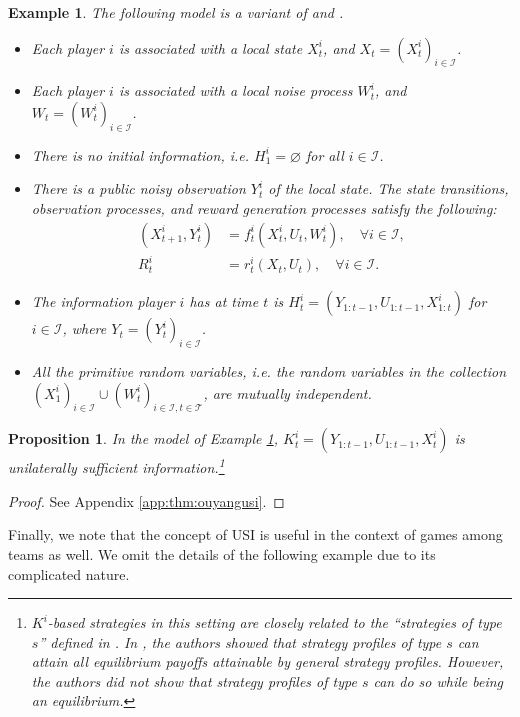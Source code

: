 \documentclass[pdflatex,sn-basic]{sn-jnl}
\newcommand{\Comp}{K}
\theoremstyle{thmstyleone}%
\newtheorem{prop}{Proposition}
\theoremstyle{thmstyletwo}%
\theoremstyle{thmstylethree}%
\newtheorem{example}{Example}
\begin{document}
\begin{example}\label{ex:ouyang}
	The following model is a variant of \cite{ouyang2016dynamic} and \cite{vasal2019spbe}.
	\begin{itemize}
		\item Each player $i$ is associated with a local state $X_t^i$, and $X_t=(X_t^i)_{i\in\mathcal{I}}$.
		\item Each player $i$ is associated with a local noise process $W_t^i$, and $W_t=(W_t^{i})_{i\in\mathcal{I}}$.
		\item There is no initial information, i.e. $H_1^i=\varnothing$ for all $i\in\mathcal{I}$.
		\item There is a public noisy observation $Y_t^i$ of the local state. The state transitions, observation processes, and reward generation processes satisfy the following:
		\begin{align}
			(X_{t+1}^i, Y_t^i) &= f_t^i(X_t^i, U_t, W_t^i),\quad\forall i\in\mathcal{I},\\
			R_t^i &= r_t^i(X_t, U_t),\quad\forall i\in\mathcal{I}.
		\end{align}
		\item The information player $i$ has at time $t$ is $H_t^i=(Y_{1:t-1}, U_{1:t-1}, X_{1:t}^i)$ for $i\in\mathcal{I}$, where $Y_t=(Y_t^i)_{i\in\mathcal{I}}$.
		\item All the primitive random variables, i.e. the random variables in the collection $(X_1^i)_{i\in\mathcal{I}}\cup (W_t^{i})_{i\in\mathcal{I}, t\in\mathcal{T}}$, are mutually independent.
	\end{itemize}
\end{example}

\begin{prop}\label{thm:ouyangusi}
	In the model of Example \ref{ex:ouyang}, $\Comp_t^i=(Y_{1:t-1}, U_{1:t-1}, X_t^i)$ is unilaterally sufficient information.\footnote{$\Comp^i$-based strategies in this setting are closely related to the ``strategies of type $s$'' defined in \cite{vasal2019spbe}. In \cite{vasal2019spbe}, the authors showed that strategy profiles of type $s$ can attain all equilibrium payoffs attainable by general strategy profiles. However, the authors did not show that strategy profiles of type $s$ can do so while being an equilibrium.}
\end{prop}
\begin{proof}
    See Appendix \ref{app:thm:ouyangusi}.
\end{proof}

Finally, we note that the concept of USI is useful in the context of games among teams as well. {We omit the details of the following example due to its complicated nature.}
\end{document}
